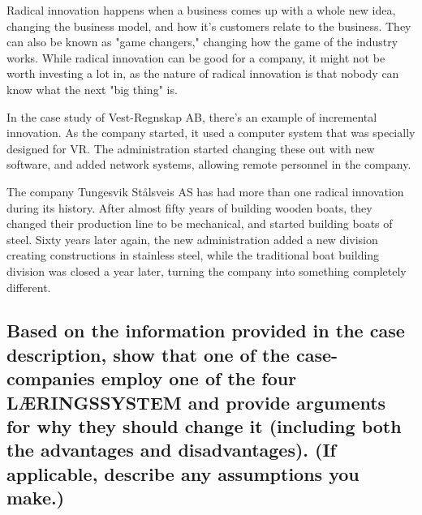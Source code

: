\documentclass[a4paper]{article}
\begin{document}
    Radical innovation happens when a business comes up with a whole new
    idea, changing the business model, and how it's customers relate to the
    business. They can also be known as "game changers," changing how the
    game of the industry works. While radical innovation can be good for
    a company, it might not be worth investing a lot in, as the nature of
    radical innovation is that nobody can know what the next "big thing" is.

    In the case study of Vest-Regnskap AB, there's an example of incremental
    innovation. As the company started, it used a computer system that was
    specially designed for VR. The administration started changing these out
    with new software, and added network systems, allowing remote personnel in
    the company.

    The company Tungesvik Stålsveis AS has had more than one radical
    innovation during its history. After almost fifty years of building wooden
    boats, they changed their production line to be mechanical, and started
    building boats of steel. Sixty years later again, the new administration
    added a new division creating constructions in stainless steel, while the
    traditional boat building division was closed a year later, turning the
    company into something completely different.

    \subsection*{Based on the information provided in the case description,
    show that one of the case-companies employ one of the four LÆRINGSSYSTEM
    and provide arguments for why they should change it (including both the
    advantages and disadvantages). (If applicable, describe any assumptions
    you make.)}
\end{document}
